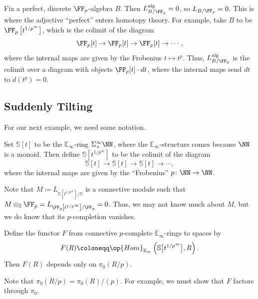 \documentclass[../notes.tex]{subfiles}
\begin{document}
\begin{example}
	Fix a perfect, discrete $\FF_p$-algebra $B$. Then $L_{B/\FF_p}^{\mathrm{alg}}=0$, so $L_{B/\FF_p}=0$. This is where the adjective ``perfect'' enters homotopy theory. For example, take $B$ to be $\FF_p\left[t^{1/p^\infty}\right]$, which is the colimit of the diagram
	\[\FF_p[t]\to\FF_p[t]\to\FF_p[t]\to\cdots,\]
	where the internal maps are given by the Frobenius $t\mapsto t^p$. Thus, $L_{B/\FF_p}^{\mathrm{alg}}$ is the colimit over a diagram with objects $\FF_p[t]\cdot dt$, where the internal maps send $dt$ to $d\left(t^p\right)=0$.
\end{example}

\subsection{Suddenly Tilting}
For our next example, we need some notation.
\begin{notation}
	Set $\mathbb S[t]$ to be the $\mathbb E_\infty$-ring $\Sigma_+^\infty\NN$, where the $\mathbb E_\infty$-structure comes because $\NN$ is a monoid. Then define $\mathbb S\left[t^{1/p^\infty}\right]$ to be the colimit of the diagram
	\[\mathbb S[t]\to\mathbb S[t]\to\mathbb S[t]\to\cdots,\]
	where the internal maps are given by the ``Frobenius'' $p\colon\NN\to\NN$.
\end{notation}
\begin{example}
	Note that $M\coloneqq L_{\mathbb S\left[t^{1/p^\infty}\right]/\mathbb S}$ is a connective module such that $M\otimes_{\mathbb S}\FF_p=L_{\FF_p\left[t^{1/p^\infty}\right]/\FF_p}=0$. Thus, we may not know much about $M$, but we do know that its $p$-completion vanishes.
\end{example}
\begin{proposition}
	Define the functor $F$ from connective $p$-complete $\mathbb E_\infty$-rings to spaces by
	\[F(R)\coloneqq\op{Hom}_{\mathbb E_\infty}\left(\mathbb S\big[t^{1/p^\infty}\big],R\right).\]
	Then $F(R)$ depends only on $\pi_0(R/p)$.
\end{proposition}
\begin{remark}
	Note that $\pi_0(R/p)=\pi_0(R)/(p)$. For example, we must show that $F$ factors through $\pi_0$.
\end{remark}
\end{document}
